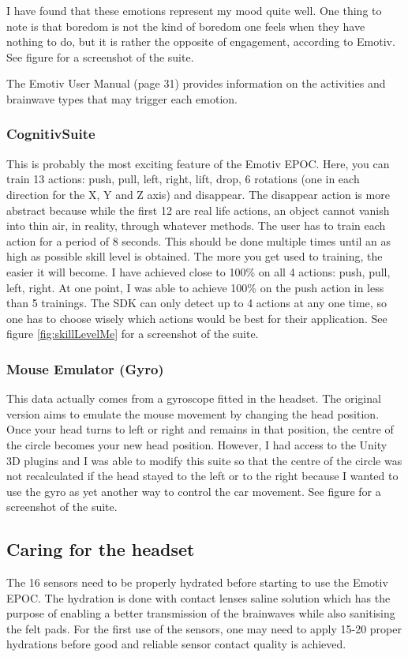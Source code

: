 I have found that these emotions represent my mood quite well. One thing to note is that boredom is not the kind of boredom one feels when they have nothing to do, but it is rather the opposite of engagement, according to Emotiv. See figure for a screenshot of the suite.

The Emotiv User Manual \cite{emotivUserManual} (page 31) provides information on the activities and brainwave types that may trigger each emotion.

\subsubsection{Cognitiv\texttrademark  Suite}
This is probably the most exciting feature of the Emotiv EPOC. Here, you can train 13 actions: push, pull, left, right, lift, drop, 6 rotations (one in each direction for the X, Y and Z axis) and disappear. The disappear action is more abstract because while the first 12 are real life actions, an object cannot vanish into thin air, in reality, through whatever methods. The user has to train each action for a period of 8 seconds. This should be done multiple times until an as high as possible skill level is obtained. The more you get used to training, the easier it will become. I have achieved close to 100\% on all 4 actions: push, pull, left, right. At one point, I was able to achieve 100\% on the push action in less than 5 trainings. The SDK can only detect up to 4 actions at any one time, so one has to choose wisely which actions would be best for their application. See figure \ref{fig:skillLevelMe} for a screenshot of the suite.

\subsubsection{Mouse Emulator (Gyro)}

This data actually comes from a gyroscope fitted in the headset. The original version aims to emulate the mouse movement by changing the head position. Once your head turns to left or right and remains in that position, the centre of the circle becomes your new head position. However, I had access to the Unity 3D plugins and I was able to modify this suite so that the centre of the circle was not recalculated if the head stayed to the left or to the right because I wanted to use the gyro as yet another way to control the car movement. See figure for a screenshot of the suite.

\subsection{Caring for the headset}
The 16 sensors need to be properly hydrated before starting to use the Emotiv EPOC. The hydration is done with contact lenses saline solution which has the purpose of enabling a better transmission of the brainwaves while also sanitising the felt pads. For the first use of the sensors, one may need to apply 15-20 proper hydrations before good and reliable sensor contact quality is achieved.

